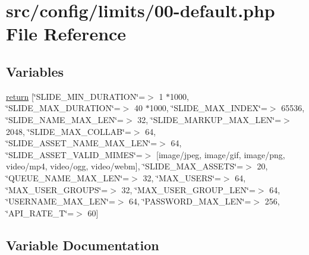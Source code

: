 \hypertarget{limits_200-default_8php}{}\section{src/config/limits/00-\/default.php File Reference}
\label{limits_200-default_8php}
\subsection*{Variables}
\begin{DoxyCompactItemize}
\item 
\hyperlink{limits_200-default_8php_aba846cf3d651d6c1282d646eb99dfd5f}{return} \mbox{[}\char`\"{}S\+L\+I\+D\+E\+\_\+\+M\+I\+N\+\_\+\+D\+U\+R\+A\+T\+I\+ON\char`\"{}=$>$ 1 $\ast$1000, \char`\"{}S\+L\+I\+D\+E\+\_\+\+M\+A\+X\+\_\+\+D\+U\+R\+A\+T\+I\+ON\char`\"{}=$>$ 40 $\ast$1000, \char`\"{}S\+L\+I\+D\+E\+\_\+\+M\+A\+X\+\_\+\+I\+N\+D\+EX\char`\"{}=$>$ 65536, \char`\"{}S\+L\+I\+D\+E\+\_\+\+N\+A\+M\+E\+\_\+\+M\+A\+X\+\_\+\+L\+EN\char`\"{}=$>$ 32, \char`\"{}S\+L\+I\+D\+E\+\_\+\+M\+A\+R\+K\+U\+P\+\_\+\+M\+A\+X\+\_\+\+L\+EN\char`\"{}=$>$ 2048, \char`\"{}S\+L\+I\+D\+E\+\_\+\+M\+A\+X\+\_\+\+C\+O\+L\+L\+AB\char`\"{}=$>$ 64, \char`\"{}S\+L\+I\+D\+E\+\_\+\+A\+S\+S\+E\+T\+\_\+\+N\+A\+M\+E\+\_\+\+M\+A\+X\+\_\+\+L\+EN\char`\"{}=$>$ 64, \char`\"{}S\+L\+I\+D\+E\+\_\+\+A\+S\+S\+E\+T\+\_\+\+V\+A\+L\+I\+D\+\_\+\+M\+I\+M\+ES\char`\"{}=$>$ \mbox{[}\textquotesingle{}image/jpeg\textquotesingle{}, \textquotesingle{}image/gif\textquotesingle{}, \textquotesingle{}image/png\textquotesingle{}, \textquotesingle{}video/mp4\textquotesingle{}, \textquotesingle{}video/ogg\textquotesingle{}, \textquotesingle{}video/webm\textquotesingle{}\mbox{]}, \char`\"{}S\+L\+I\+D\+E\+\_\+\+M\+A\+X\+\_\+\+A\+S\+S\+E\+TS\char`\"{}=$>$ 20, \char`\"{}Q\+U\+E\+U\+E\+\_\+\+N\+A\+M\+E\+\_\+\+M\+A\+X\+\_\+\+L\+EN\char`\"{}=$>$ 32, \char`\"{}M\+A\+X\+\_\+\+U\+S\+E\+RS\char`\"{}=$>$ 64, \char`\"{}M\+A\+X\+\_\+\+U\+S\+E\+R\+\_\+\+G\+R\+O\+U\+PS\char`\"{}=$>$ 32, \char`\"{}M\+A\+X\+\_\+\+U\+S\+E\+R\+\_\+\+G\+R\+O\+U\+P\+\_\+\+L\+EN\char`\"{}=$>$ 64, \char`\"{}U\+S\+E\+R\+N\+A\+M\+E\+\_\+\+M\+A\+X\+\_\+\+L\+EN\char`\"{}=$>$ 64, \char`\"{}P\+A\+S\+S\+W\+O\+R\+D\+\_\+\+M\+A\+X\+\_\+\+L\+EN\char`\"{}=$>$ 256, \char`\"{}A\+P\+I\+\_\+\+R\+A\+T\+E\+\_\+T\char`\"{}=$>$ 60\mbox{]}
\end{DoxyCompactItemize}


\subsection{Variable Documentation}
\mbox{\label{limits_200-default_8php_aba846cf3d651d6c1282d646eb99dfd5f}} 
